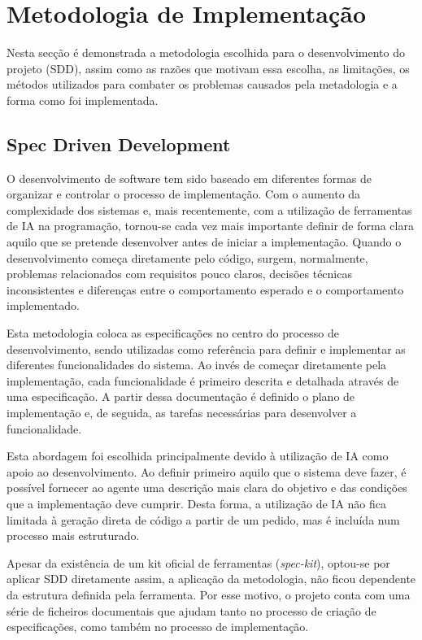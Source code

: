 \section{Metodologia de Implementação}
	
	Nesta secção é demonstrada a metodologia escolhida para o desenvolvimento do projeto (\gls{SDD}), assim como as razões que motivam essa escolha, as limitações, os métodos utilizados para combater os problemas causados pela metadologia e a forma como foi implementada.
	
	\subsection{Spec Driven Development}
	
		O desenvolvimento de software tem sido baseado em diferentes formas de organizar e controlar o processo de implementação. Com o aumento da complexidade dos sistemas e, mais recentemente, com a utilização de ferramentas de \gls{IA} na programação, tornou-se cada vez mais importante definir de forma clara aquilo que se pretende desenvolver antes de iniciar a implementação. Quando o desenvolvimento começa diretamente pelo código, surgem, normalmente, problemas relacionados com requisitos pouco claros, decisões técnicas inconsistentes e diferenças entre o comportamento esperado e o comportamento implementado.
		
		Esta metodologia coloca as especificações no centro do processo de desenvolvimento, sendo utilizadas como referência para definir e implementar as diferentes funcionalidades do sistema. Ao invés de começar diretamente pela implementação, cada funcionalidade é primeiro descrita e detalhada através de uma especificação. A partir dessa documentação é definido o plano de implementação e, de seguida, as tarefas necessárias para desenvolver a funcionalidade.
		
		Esta abordagem foi escolhida principalmente devido à utilização de \gls{IA} como apoio ao desenvolvimento. Ao definir primeiro aquilo que o sistema deve fazer, é possível fornecer ao agente uma descrição mais clara do objetivo e das condições que a implementação deve cumprir. Desta forma, a utilização de \gls{IA} não fica limitada à geração direta de código a partir de um pedido, mas é incluída num processo mais estruturado.
	
		Apesar da existência de um kit oficial de ferramentas (\textit{spec-kit}), optou-se por aplicar \gls{SDD} diretamente assim, a aplicação da metodologia, não ficou dependente da estrutura definida pela ferramenta. Por esse motivo, o projeto conta com uma série de ficheiros documentais que ajudam tanto no processo de criação de especificações, como também no processo de implementação.
		
